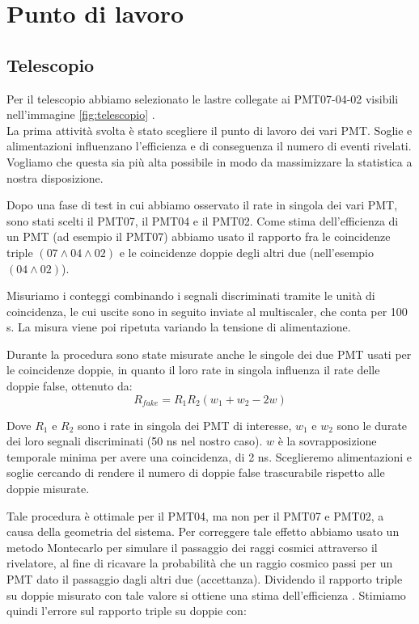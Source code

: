 \documentclass[10pt,a4paper]{article}
\begin{document}
\section{Punto di lavoro}\label{sec:Punto_lavoro}

\subsection{Telescopio} \label{subsec:telescopio}
\begin{flushleft}
Per il telescopio abbiamo selezionato le lastre collegate ai PMT07-04-02 visibili nell'immagine \ref{fig:telescopio} .\\
La prima attività svolta è stato scegliere il punto di lavoro dei vari PMT. Soglie e alimentazioni influenzano l'efficienza e di conseguenza il numero di eventi rivelati. Vogliamo che questa sia più alta possibile in modo da massimizzare la statistica a nostra disposizione. 

Dopo una fase di test in cui abbiamo osservato il rate in singola dei vari PMT, sono stati scelti il PMT07, il PMT04 e il PMT02. Come stima dell'efficienza di un PMT (ad esempio il PMT07) abbiamo usato il rapporto fra le coincidenze triple $(07\land04\land02)$ e le coincidenze doppie degli altri due (nell'esempio $(04\land02)$). 

Misuriamo i conteggi combinando i segnali discriminati tramite le unità di coincidenza, le cui uscite sono in seguito inviate al multiscaler, che conta per 100 s. La misura viene poi ripetuta variando la tensione di alimentazione.

Durante la procedura sono state misurate anche le singole dei due PMT usati per le coincidenze doppie, in quanto il loro rate in singola influenza il rate delle doppie false, ottenuto da:
\begin{equation}
    \label{fake}
    R_{fake} = R_1 R_2 (w_1 + w_2 - 2w)
\end{equation}

Dove $R_1$ e $R_2$ sono i rate in singola dei PMT di interesse, $w_1$ e $w_2$ sono le durate dei loro segnali discriminati (50 ns nel nostro caso). $w$ è la sovrapposizione temporale minima per avere una coincidenza, di 2 ns. Sceglieremo alimentazioni e soglie cercando di rendere il numero di doppie false trascurabile rispetto alle doppie misurate.


Tale procedura è ottimale per il PMT04, ma non per il PMT07 e PMT02, a causa della geometria del sistema. 
Per correggere tale effetto abbiamo usato un metodo Montecarlo per simulare il passaggio dei raggi cosmici attraverso il rivelatore, al fine di ricavare la probabilità che un raggio cosmico passi per un PMT dato il passaggio dagli altri due (accettanza). 
Dividendo il rapporto triple su doppie misurato con tale valore si ottiene una stima dell'efficienza . Stimiamo quindi l'errore sul rapporto triple su doppie con: 


\end{flushleft}
\end{document}
